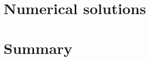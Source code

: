 \documentclass[12pt]{article}
\begin{document}
\section*{Numerical solutions}

\section*{Summary}
  
\end{document}
